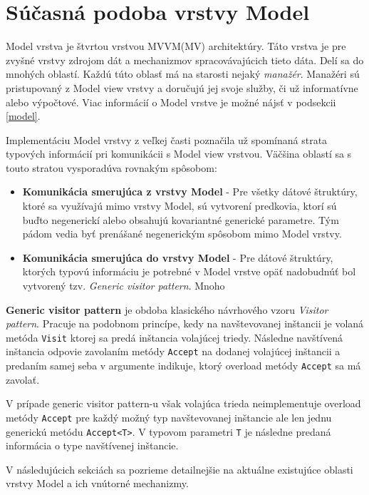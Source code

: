 \chapter{Súčasná podoba vrstvy Model}\label{architektura_model_vrstvy}

Model vrstva je štvrtou vrstvou MVVM(MV) architektúry. Táto vrstva je pre zvyšné vrstvy zdrojom dát a mechanizmov spracovávajúcich tieto dáta. Delí sa do mnohých oblastí. Každú túto oblasť má na starosti nejaký \textit{manažér}. Manažéri sú pristupovaný z Model view vrstvy a doručujú jej svoje služby, či už informatívne alebo výpočtové. Viac informácií o Model vrstve je možné nájsť v podsekcii \ref{model}.

Implementáciu Model vrstvy z veľkej časti poznačila už spomínaná strata typových informácií pri komunikácii s Model view vrstvou. Väčšina oblastí sa s touto stratou vysporadúva rovnakým spôsobom:
\begin{itemize}
    \item \textbf{Komunikácia smerujúca z vrstvy Model} - Pre všetky dátové štruktúry, ktoré sa využívajú mimo vrstvy Model, sú vytvorení predkovia, ktorí sú buďto negenerickí alebo obsahujú kovariantné generické parametre. Tým pádom vedia byť prenášané negenerickým spôsobom mimo Model vrstvy.
    \item \textbf{Komunikácia smerujúca do vrstvy Model} - Pre dátové štruktúry, ktorých typovú informáciu je potrebné v Model vrstve opäť nadobudnúť bol vytvorený tzv. \textit{Generic visitor pattern}. Mnoho   
\end{itemize} 

\begin{definice}
    \textbf{Generic visitor pattern} je obdoba klasického návrhového vzoru \emph{Visitor pattern}. Pracuje na podobnom princípe, kedy na navštevovanej inštancii je volaná metóda \texttt{Visit} ktorej sa predá inštancia volajúcej triedy. Následne navštívená inštancia odpovie zavolaním metódy \texttt{Accept} na dodanej volajúcej inštancii a predaním samej seba v argumente indikuje, ktorý overload metódy \texttt{Accept} sa má zavolať.

    V prípade generic visitor pattern-u však volajúca trieda neimplementuje overload metódy \texttt{Accept} pre každý možný typ navštevovanej inštancie ale len jednu generickú metódu \texttt{Accept<T>}. V typovom parametri \texttt{T} je následne predaná informácia o type navštívenej inštancie.
\end{definice}

V následujúcich sekciách sa pozrieme detailnejšie na aktuálne existujúce oblasti vrstvy Model a ich vnútorné mechanizmy.

